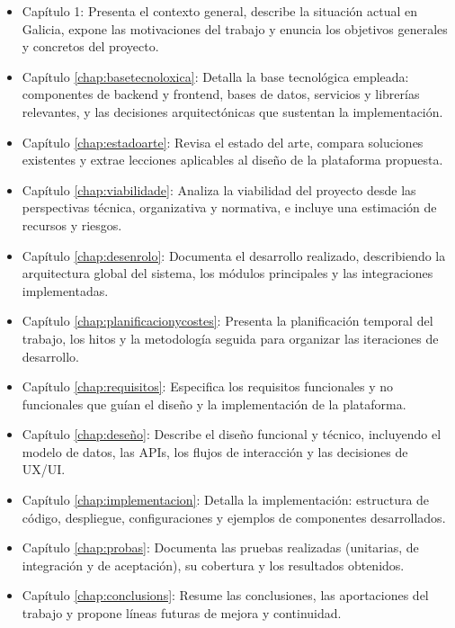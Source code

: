 \begin{itemize}
    \item Capítulo 1: Presenta el contexto general, describe la situación actual en Galicia, expone las motivaciones del trabajo y enuncia los objetivos generales y concretos del proyecto.
    \item Capítulo \ref{chap:basetecnoloxica}: Detalla la base tecnológica empleada: componentes de backend y frontend, bases de datos, servicios y librerías relevantes, y las decisiones arquitectónicas que sustentan la implementación.
    \item Capítulo \ref{chap:estadoarte}: Revisa el estado del arte, compara soluciones existentes y extrae lecciones aplicables al diseño de la plataforma propuesta.
    \item Capítulo \ref{chap:viabilidade}: Analiza la viabilidad del proyecto desde las perspectivas técnica, organizativa y normativa, e incluye una estimación de recursos y riesgos.
    \item Capítulo \ref{chap:desenrolo}: Documenta el desarrollo realizado, describiendo la arquitectura global del sistema, los módulos principales y las integraciones implementadas.
    \item Capítulo \ref{chap:planificacionycostes}: Presenta la planificación temporal del trabajo, los hitos y la metodología seguida para organizar las iteraciones de desarrollo.
    \item Capítulo \ref{chap:requisitos}: Especifica los requisitos funcionales y no funcionales que guían el diseño y la implementación de la plataforma.
    \item Capítulo \ref{chap:deseño}: Describe el diseño funcional y técnico, incluyendo el modelo de datos, las APIs, los flujos de interacción y las decisiones de UX/UI.
    \item Capítulo \ref{chap:implementacion}: Detalla la implementación: estructura de código, despliegue, configuraciones y ejemplos de componentes desarrollados.
    \item Capítulo \ref{chap:probas}: Documenta las pruebas realizadas (unitarias, de integración y de aceptación), su cobertura y los resultados obtenidos.
    \item Capítulo \ref{chap:conclusions}: Resume las conclusiones, las aportaciones del trabajo y propone líneas futuras de mejora y continuidad.
\end{itemize}
